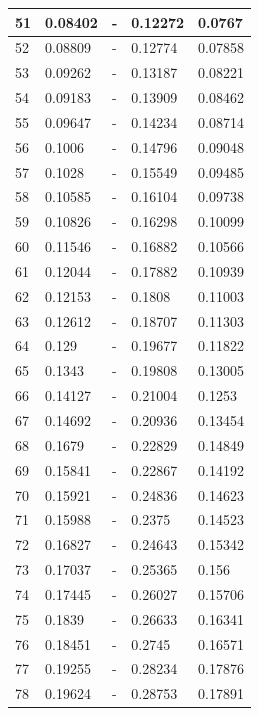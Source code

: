 \begin{tiny}
\begin{longtable}{|l|l|l|l|l|}
        51 & 0.08402 & - & 0.12272 & 0.0767 \\ \hline
        52 & 0.08809 & - & 0.12774 & 0.07858 \\ \hline
        53 & 0.09262 & - & 0.13187 & 0.08221 \\ \hline
        54 & 0.09183 & - & 0.13909 & 0.08462 \\ \hline
        55 & 0.09647 & - & 0.14234 & 0.08714 \\ \hline
        56 & 0.1006 & - & 0.14796 & 0.09048 \\ \hline
        57 & 0.1028 & - & 0.15549 & 0.09485 \\ \hline
        58 & 0.10585 & - & 0.16104 & 0.09738 \\ \hline
        59 & 0.10826 & - & 0.16298 & 0.10099 \\ \hline
        60 & 0.11546 & - & 0.16882 & 0.10566 \\ \hline
        61 & 0.12044 & - & 0.17882 & 0.10939 \\ \hline
        62 & 0.12153 & - & 0.1808 & 0.11003 \\ \hline
        63 & 0.12612 & - & 0.18707 & 0.11303 \\ \hline
        64 & 0.129 & - & 0.19677 & 0.11822 \\ \hline
        65 & 0.1343 & - & 0.19808 & 0.13005 \\ \hline
        66 & 0.14127 & - & 0.21004 & 0.1253 \\ \hline
        67 & 0.14692 & - & 0.20936 & 0.13454 \\ \hline
        68 & 0.1679 & - & 0.22829 & 0.14849 \\ \hline
        69 & 0.15841 & - & 0.22867 & 0.14192 \\ \hline
        70 & 0.15921 & - & 0.24836 & 0.14623 \\ \hline
        71 & 0.15988 & - & 0.2375 & 0.14523 \\ \hline
        72 & 0.16827 & - & 0.24643 & 0.15342 \\ \hline
        73 & 0.17037 & - & 0.25365 & 0.156 \\ \hline
        74 & 0.17445 & - & 0.26027 & 0.15706 \\ \hline
        75 & 0.1839 & - & 0.26633 & 0.16341 \\ \hline
        76 & 0.18451 & - & 0.2745 & 0.16571 \\ \hline
        77 & 0.19255 & - & 0.28234 & 0.17876 \\ \hline
        78 & 0.19624 & - & 0.28753 & 0.17891 \\ \hline

\end{longtable}
\end{tiny}

